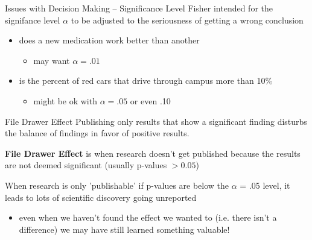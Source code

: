 \documentclass{beamer}
\begin{document}
\begin{frame}{Issues with Decision Making -- Significance Level}
Fisher intended for the signifance level $\alpha$ to be adjusted to the seriousness of getting a wrong conclusion
    \begin{itemize}
        \item does a new medication work better than another
        \begin{itemize}
            \item may want $\alpha = .01$
        \end{itemize}
        \item is the percent of red cars that drive through campus more than 10\%
        \begin{itemize}
            \item might be ok with $\alpha=.05$ or even .10
        \end{itemize}
    \end{itemize}    
\end{frame}

\begin{frame}{File Drawer Effect}
Publishing only results that show a significant finding disturbs the balance of findings in favor of positive results.\footnotemark
\vspace{4mm}

\textbf{File Drawer Effect} is when research doesn't get published because the results are not deemed significant (usually p-values $> 0.05$) \vspace{6mm}

When research is only 'publishable' if p-values are below the $\alpha$ = .05 level, it leads to lots of scientific discovery going unreported
\begin{itemize}
    \item even when we haven't found the effect we wanted to (i.e. there isn't a difference) we may have still learned something valuable!
\end{itemize}

\end{frame}
\end{document}
